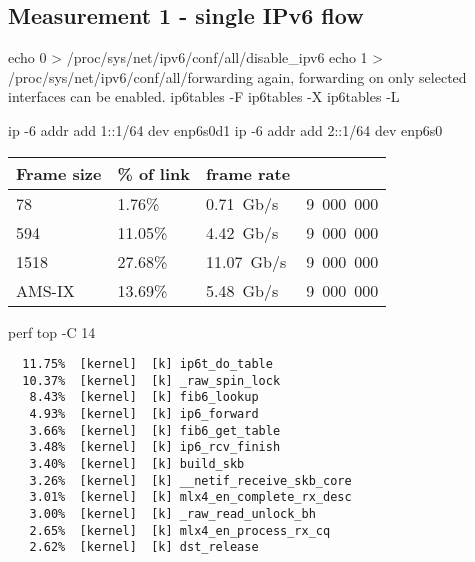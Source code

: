 
\subsection{Measurement 1 - single IPv6 flow}

echo 0 > /proc/sys/net/ipv6/conf/all/disable\_ipv6
echo 1 > /proc/sys/net/ipv6/conf/all/forwarding
again, forwarding on only selected interfaces can be enabled.
ip6tables -F
ip6tables -X
ip6tables -L

ip -6 addr add 1::1/64 dev enp6s0d1
ip -6 addr add 2::1/64 dev enp6s0



\begin{tabular}{ | l | l | l | l | }
\hline
Frame size & \% of link & frame rate \\
\hline
78     &  1.76\% &  0.71~Gb/s & 9~000~000 \\
594    & 11.05\% &  4.42~Gb/s & 9~000~000 \\
1518   & 27.68\% & 11.07~Gb/s & 9~000~000 \\
AMS-IX & 13.69\% &  5.48~Gb/s & 9~000~000 \\
\hline
\end{tabular}

perf top -C 14
\begin{lstlisting}
  11.75%  [kernel]  [k] ip6t_do_table
  10.37%  [kernel]  [k] _raw_spin_lock
   8.43%  [kernel]  [k] fib6_lookup
   4.93%  [kernel]  [k] ip6_forward
   3.66%  [kernel]  [k] fib6_get_table
   3.48%  [kernel]  [k] ip6_rcv_finish
   3.40%  [kernel]  [k] build_skb
   3.26%  [kernel]  [k] __netif_receive_skb_core
   3.01%  [kernel]  [k] mlx4_en_complete_rx_desc
   3.00%  [kernel]  [k] _raw_read_unlock_bh
   2.65%  [kernel]  [k] mlx4_en_process_rx_cq
   2.62%  [kernel]  [k] dst_release
\end{lstlisting}
